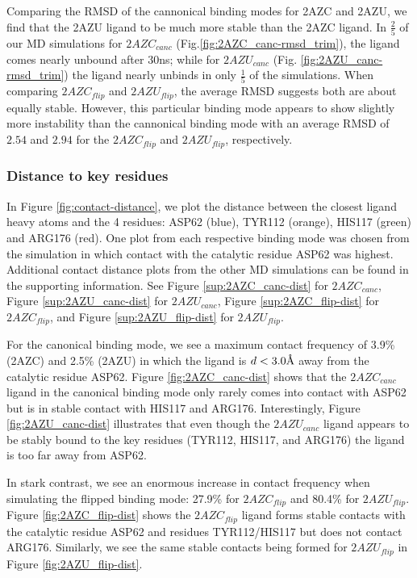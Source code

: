 \documentclass[fleqn,10pt]{wlscirep}
\newcommand{\angstrom}{\text{\normalfont\AA}}
\begin{document}
Comparing the RMSD of the cannonical binding modes for 2AZC and 2AZU, we find that the 2AZU ligand to be much more stable than the 2AZC ligand.
In $\frac{2}{5}$ of our MD simulations for $2AZC_{canc}$ (Fig.\ref{fig:2AZC_canc-rmsd_trim}), the ligand comes nearly unbound after 30ns; while for $2AZU_{canc}$ (Fig. \ref{fig:2AZU_canc-rmsd_trim}) the ligand nearly unbinds in only $\frac{1}{5}$ of the simulations.
When comparing $2AZC_{flip}$ and $2AZU_{flip}$, the average RMSD suggests both are about equally stable.
However, this particular binding mode appears to show slightly more instability than the cannonical binding mode with an average RMSD of $2.54$ and $2.94$ for the $2AZC_{flip}$ and $2AZU_{flip}$, respectively.

\subsubsection{Distance to key residues}

In Figure \ref{fig:contact-distance}, we plot the distance between the closest ligand heavy atoms and the 4 residues: ASP62 (blue), TYR112 (orange), HIS117 (green) and ARG176 (red).
One plot from each respective binding mode was chosen from the simulation in which contact with the catalytic residue ASP62 was highest.
Additional contact distance plots from the other MD simulations can be found in the supporting information.
See Figure \ref{sup:2AZC_canc-dist} for $2AZC_{canc}$, Figure \ref{sup:2AZU_canc-dist} for $2AZU_{canc}$, Figure \ref{sup:2AZC_flip-dist} for $2AZC_{flip}$, and Figure \ref{sup:2AZU_flip-dist} for $2AZU_{flip}$.

For the canonical binding mode, we see a maximum contact frequency of 3.9\% (2AZC) and 2.5\% (2AZU) in which the ligand is $d<3.0\angstrom$ away from the catalytic residue ASP62.
Figure \ref{fig:2AZC_canc-dist} shows that the $2AZC_{canc}$ ligand in the canonical binding mode only rarely comes into contact with ASP62 but is in stable contact with HIS117 and ARG176.
Interestingly, Figure \ref{fig:2AZU_canc-dist} illustrates that even though the $2AZU_{canc}$ ligand appears to be stably bound to the key residues (TYR112, HIS117, and ARG176) the ligand is too far away from ASP62.

In stark contrast, we see an enormous increase in contact frequency when simulating the flipped binding mode: 27.9\% for $2AZC_{flip}$ and 80.4\% for $2AZU_{flip}$.
Figure \ref{fig:2AZC_flip-dist} shows the $2AZC_{flip}$ ligand forms stable contacts with the catalytic residue ASP62 and residues TYR112/HIS117 but does not contact ARG176.
Similarly, we see the same stable contacts being formed for $2AZU_{flip}$ in Figure \ref{fig:2AZU_flip-dist}.
\end{document}
